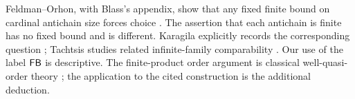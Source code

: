 Feldman--Orhon, with Blass's appendix, show that any fixed finite bound on cardinal antichain size forces choice \cite{FO}. The assertion that each antichain is finite has no fixed bound and is different. Karagila explicitly records the corresponding question \cite{Karagila}; Tachtsis studies related infinite-family comparability \cite{Tachtsis2018}. Our use of the label $\mathsf{FB}$ is descriptive. The finite-product order argument is classical well-quasi-order theory \cite{Higman,Rado}; the application to the cited construction is the additional deduction.
